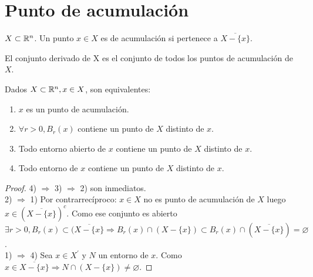 \section{Punto de acumulación}

\begin{definition}
  $X \subset \mathbb{R}^n$. Un punto $x \in X$ es de acumulación si pertenece a $\overline{X - \{ x \}}$. \\
\end{definition}

\begin{definition}
  El conjunto derivado de X es el conjunto de todos los puntos de acumulación de $X$.
\end{definition}

\begin{prop}
  Dados $X \subset \mathbb{R}^n, x \in X$, son equivalentes:
  \begin{enumerate}
    \item $x$ es un punto de acumulación.
    \item $\forall r > 0, B_r(x)$ contiene un punto de $X$ distinto de $x$.
    \item Todo entorno abierto de $x$ contiene un punto de $X$ distinto de $x$.
    \item Todo entorno de $x$ contiene un punto de $X$ distinto de $x$.
  \end{enumerate}

  \begin{proof}
    4) $\Rightarrow$ 3) $\Rightarrow$ 2) son inmediatos. \\
    2) $\Rightarrow$ 1) Por contrarrecíproco: $x \in X$ no es punto de acumulación de $X$ luego $x \in (\overline{X - \{x\}})^c$. Como ese conjunto es abierto $\exists r > 0, B_r(x) \subset (\overline{X - \{ x \}} \Rightarrow B_r(x) \cap (X - \{x \}) \subset B_r(x) \cap (\overline{X - \{x\}}) = \varnothing$. \\
    1) $\Rightarrow$ 4) Sea $x \in X^{\prime}$ y $N$ un entorno de $x$. Como $x \in \overline{X - \{x\}} \Rightarrow N \cap (X - \{x\}) \neq \varnothing$.
  \end{proof}
\end{prop}

